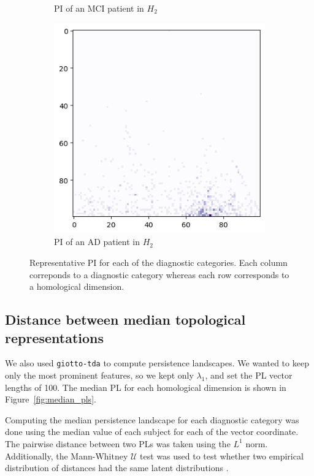 \documentclass{article}
\begin{document}
\begin{figure}
\begin{subfigure}{0.32\textwidth}
    \caption{PI of an MCI patient in $H_2$}
  \end{subfigure}
  \begin{subfigure}{0.32\textwidth}
    \includegraphics[width=\textwidth]{figures/PIs/Persistence_image_AD_h_2.png}
    \caption{PI of an AD patient in $H_2$}
  \end{subfigure}
  \caption{Representative PI for each of the diagnostic categories. Each column correponds to a
    diagnostic category whereas each row corresponds to a homological dimension.}
  \label{fig:sample_rep_pi}
\end{figure}

\subsection{Distance between median topological representations}

We also used \texttt{giotto-tda} to compute persistence landscapes. We wanted to keep only the most
prominent features, so we kept only $\lambda_1$, and set the PL vector lengths of 100. The
median PL for each homological dimension is shown in Figure~\ref{fig:median_pls}.

Computing the median persistence landscape for each diagnostic category was done using the median
value of each subject for each of the vector coordinate. The pairwise distance between two PLs was
taken using the $L^1$ norm. Additionally, the Mann-Whitney $\mathcal{U}$ test
was used to test whether two empirical distribution of distances had the same
latent distributions \citep{mann1947test}.
\end{document}
